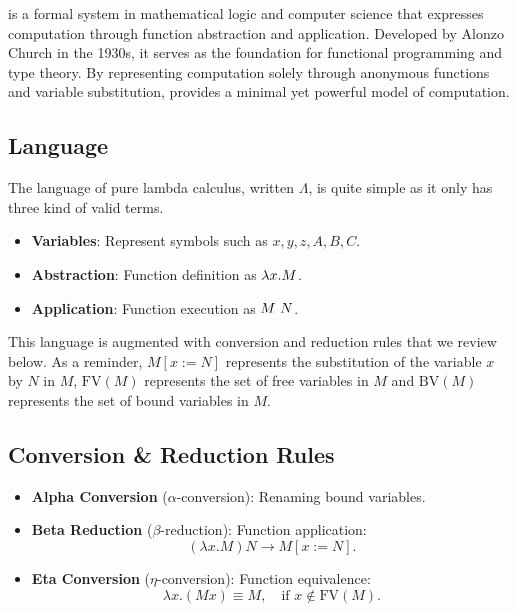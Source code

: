 \lambdacalc is a formal system in mathematical logic and computer science that expresses computation through function abstraction and application. Developed by Alonzo Church in the 1930s, it serves as the foundation for functional programming and type theory. By representing computation solely through anonymous functions and variable substitution, \lambdacalc provides a minimal yet powerful model of computation.

\subsection{Language}

The language of pure lambda calculus, written $\Lambda$, is quite simple as it only has three kind of valid terms.

\begin{itemize}
    \item \textbf{Variables}: Represent symbols such as $x, y, z, A, B, C$.
    \item \textbf{Abstraction}: Function definition as $\lambda x.M$.
    \item \textbf{Application}: Function execution as $M\ N$.
\end{itemize}

This language is augmented with conversion and reduction rules that we review below. As a reminder, $M[x := N]$ represents the substitution of the variable $x$ by $N$ in $M$, $\text{FV}(M)$ represents the set of free variables in $M$ and $\text{BV}(M)$ represents the set of bound variables in $M$.

\subsection{Conversion \& Reduction Rules}
\begin{itemize}
    \item \textbf{Alpha Conversion} ($\alpha$-conversion): Renaming bound variables.
    \item \textbf{Beta Reduction} ($\beta$-reduction): Function application:
    \[
        (\lambda x. M) N \rightarrow M[x := N].
    \]
    \item \textbf{Eta Conversion} ($\eta$-conversion): Function equivalence:
    \[
        \lambda x. (M x) \equiv M, \quad \text{if } x \notin \text{FV}(M).
    \]
\end{itemize}